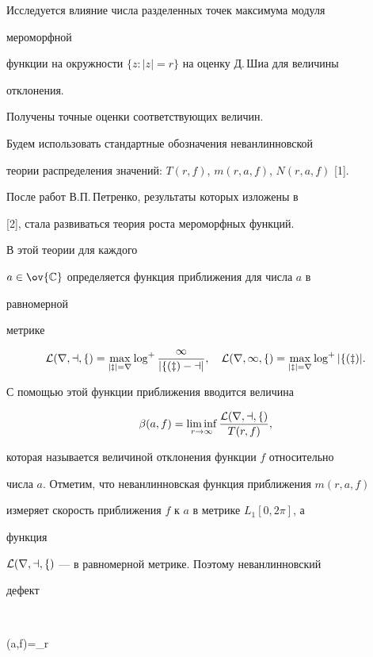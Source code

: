  


Исследуется влияние числа разделенных точек максимума модуля 


мероморфной 


функции на окружности $\{z:|z|=r\}$ на оценку Д.\,Шиа для величины 


отклонения. 


Получены точные оценки соответствующих величин. 


 


Будем использовать стандартные обозначения неванлинновской 


теории распределения значений: $T(r,f)$, $m(r,a,f)$, $N(r,a,f)$ [1]. 


 


После работ В.П.\,Петренко, результаты которых изложены в 


[2], стала развиваться теория роста мероморфных функций. 


В этой теории для каждого 


$a\in\ov{\Bbb C}$ определяется функция приближения для числа $a$ в 


равномерной 


метрике 


$$ 


\cal L(r,a,f)=\max_{|z|=r}\log^+\frac{1}{|f(z)-a|},\quad 


\cal L(r,\infty,f)=\max_{|z|=r}\log^+|f(z)|. 


$$ 


С помощью этой функции приближения вводится величина 


$$ 


\beta(a,f)=\liminf_{r\to\infty} 


\frac{\cal L(r,a,f)}{T(r,f)},


$$ 


которая называется величиной отклонения функции $f$ относительно 


числа $a$. Отметим, что неванлинновская функция приближения $m(r,a,f)$ 


измеряет скорость приближения $f$ к $a$ в метрике $L_1[0,2\pi]$, а 


функция 


$\cal L(r,a,f)$ --- в равномерной метрике. Поэтому неванлинновский 


дефект 


$$ 


\delta(a,f)=\liminf_{r\to\infty} 


